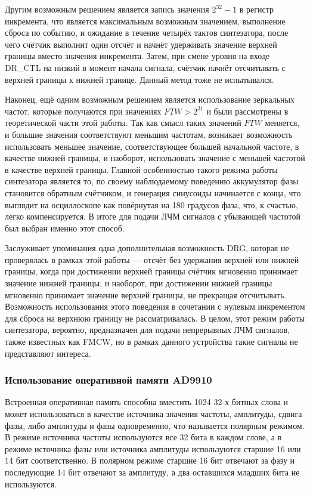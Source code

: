 \documentclass[rusmathsym, eqnumwithinsec, amspack, hyperref]{bomgost}
\begin{document}
Другим возможным решением является запись значения $2^{32}-1$ в регистр инкремента, что является максимальным возможным значением, выполнение сброса по событию, и ожидание в течение четырёх тактов синтезатора, после чего счётчик выполнит один отсчёт и начнёт удерживать значение верхней границы вместо значения инкремента. Затем, при смене уровня на входе DR\_CTL на низкий в момент начала сигнала, счётчик начнёт отсчитывать с верхней границы к нижней границе. Данный метод тоже не испытывался.

Наконец, ещё одним возможным решением является использование зеркальных частот, которые получаются при значениях $FTW > 2^{31}$ и были рассмотрены в теоретической части этой работы. Так как смысл таких значений $FTW$ меняется, и большие значения соответствуют меньшим частотам, возникает возможность использовать меньшее значение, соответствующее большей начальной частоте, в качестве нижней границы, и наоборот, использовать значение с меньшей частотой в качестве верхней границы. Главной особенностью такого режима работы синтезатора является то, по своему наблюдаемому поведению аккумулятор фазы становится обратным счётчиком, и генерация синусоиды начинается с конца, что выглядит на осциллоскопе как повёрнутая на 180 градусов фаза, что, к счастью, легко компенсируется. В итоге для подачи ЛЧМ сигналов с убывающей частотой был выбран именно этот способ.

Заслуживает упоминания одна дополнительная возможность DRG, которая не проверялась в рамках этой работы --- отсчёт без удержания верхней или нижней границы, когда при достижении верхней границы счётчик мгновенно принимает значение нижней границы, и наоборот, при достижении нижней границы мгновенно принимает значение верхней границы, не прекращая отсчитывать. Возможность использования этого поведения в сочетании с нулевым инкрементом для сброса на верхнюю границу не рассматривалась. В целом, этот режим работы синтезатора, вероятно, предназначен для подачи непрерывных ЛЧМ сигналов, также известных как FMCW, но в рамках данного устройства такие сигналы не представляют интереса.


\subsubsection{Использование оперативной памяти AD9910}

Встроенная оперативная память способна вместить 1024 32-х битных слова и может использоваться в качестве источника значения частоты, амплитуды, сдвига фазы, либо амплитуды и фазы одновременно, что называется полярным режимом. В режиме источника частоты используются все 32 бита в каждом слове, а в режиме источника фазы или источника амплитуды используются старшие 16 или 14 бит соответственно. В полярном режиме старшие 16 бит отвечают за фазу и последующие 14 бит отвечают за амплитуду, а два оставшихся младших бита не используются.
\end{document}
